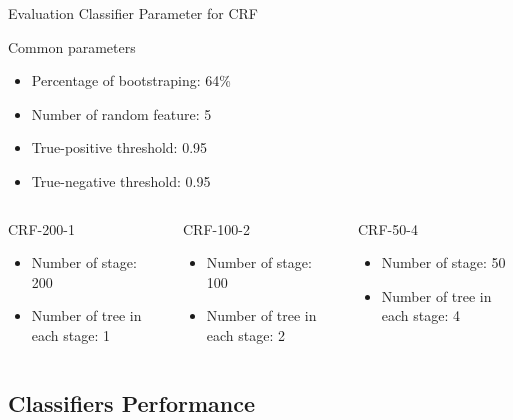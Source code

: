 \documentclass{beamer}
\begin{document}
\begin{frame}
	{Evaluation}
	{Classifier Parameter for CRF}
	\begin{block}{Common parameters}
		\begin{itemize}
			\item Percentage of bootstraping: 64\%
			\item Number of random feature: 5
			\item True-positive threshold: 0.95
			\item True-negative threshold: 0.95
		\end{itemize}
	\end{block}
	\begin{columns}
		\begin{column}{0.3\textwidth}
			\begin{block}{CRF-200-1}
				\begin{itemize}
					\item Number of stage: 200
					\item Number of tree in each stage: 1
				\end{itemize}
			\end{block}
		\end{column}

		\begin{column}{0.3\textwidth}
			\begin{block}{CRF-100-2}
				\begin{itemize}
					\item Number of stage: 100
					\item Number of tree in each stage: 2
				\end{itemize}
			\end{block}
		\end{column}

		\begin{column}{0.3\textwidth}
			\begin{block}{CRF-50-4}
				\begin{itemize}
					\item Number of stage: 50
					\item Number of tree in each stage: 4
				\end{itemize}
			\end{block}
		\end{column}
	\end{columns}
\end{frame}


\subsection{Classifiers Performance}
\end{document}
